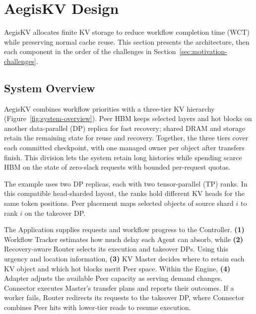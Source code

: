 \section{AegisKV Design}
\label{sec:design}

AegisKV allocates finite KV storage to reduce workflow completion time
(WCT) while preserving normal cache reuse. This section presents the
architecture, then each component in the order of the challenges in
Section~\ref{sec:motivation-challenges}.

\subsection{System Overview}
\label{sec:system-overview}

AegisKV combines workflow priorities with a three-tier KV hierarchy
(Figure~\ref{fig:system-overview}). Peer HBM keeps selected
layers and hot blocks on another data-parallel (DP) replica for fast
recovery; shared DRAM and storage retain the remaining state for reuse
and recovery. Together, the three tiers cover each committed checkpoint,
with one managed owner per object after transfers finish. This division lets
the system retain long histories while spending scarce HBM on the state
of zero-slack requests with bounded per-request quotas.

The example uses two DP replicas, each with two tensor-parallel (TP)
ranks. In this compatible head-sharded layout, the ranks hold different
KV heads for the same token positions. Peer placement maps selected
objects of source shard $i$ to rank $i$ on the takeover DP.

The Application supplies requests and workflow progress to the Controller.
\textbf{(1)} Workflow Tracker estimates how much delay each Agent can
absorb, while \textbf{(2)} Recovery-aware Router selects its execution and
takeover DPs. Using this urgency and location information, \textbf{(3)} KV
Master decides where to retain each KV object and which hot blocks merit
Peer space. Within the Engine, \textbf{(4)} Adapter adjusts the available
Peer capacity as serving demand changes. Connector executes Master's
transfer plans and reports their outcomes. If a worker fails, Router redirects its requests to the
takeover DP, where Connector combines Peer hits with lower-tier reads to
resume execution.

